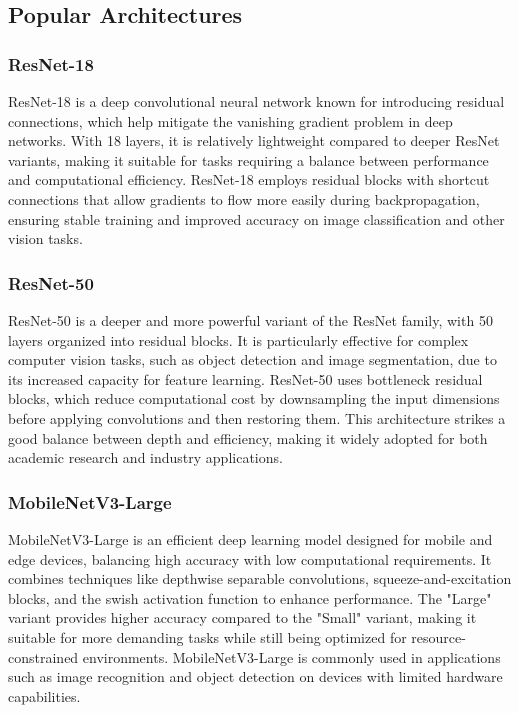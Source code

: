 \documentclass[12pt]{article}
\begin{document}
\subsection{Popular Architectures}
\subsubsection{ResNet-18  }
ResNet-18 is a deep convolutional neural network known for introducing residual connections, which help mitigate the vanishing gradient problem in deep networks. With 18 layers, it is relatively lightweight compared to deeper ResNet variants, making it suitable for tasks requiring a balance between performance and computational efficiency. ResNet-18 employs residual blocks with shortcut connections that allow gradients to flow more easily during backpropagation, ensuring stable training and improved accuracy on image classification and other vision tasks.

\subsubsection{ResNet-50}
ResNet-50 is a deeper and more powerful variant of the ResNet family, with 50 layers organized into residual blocks. It is particularly effective for complex computer vision tasks, such as object detection and image segmentation, due to its increased capacity for feature learning. ResNet-50 uses bottleneck residual blocks, which reduce computational cost by downsampling the input dimensions before applying convolutions and then restoring them. This architecture strikes a good balance between depth and efficiency, making it widely adopted for both academic research and industry applications.

\subsubsection{MobileNetV3-Large}
MobileNetV3-Large is an efficient deep learning model designed for mobile and edge devices, balancing high accuracy with low computational requirements. It combines techniques like depthwise separable convolutions, squeeze-and-excitation blocks, and the swish activation function to enhance performance. The "Large" variant provides higher accuracy compared to the "Small" variant, making it suitable for more demanding tasks while still being optimized for resource-constrained environments. MobileNetV3-Large is commonly used in applications such as image recognition and object detection on devices with limited hardware capabilities.
\end{document}
